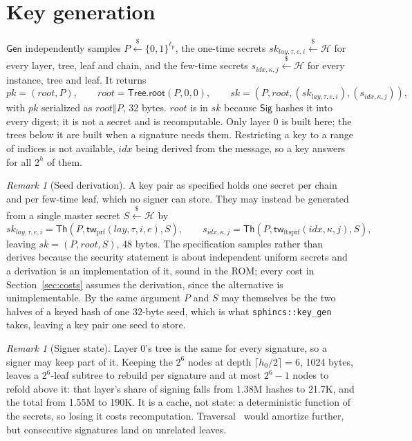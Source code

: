 \documentclass[11pt]{article}
\theoremstyle{definition}
\theoremstyle{plain}
\theoremstyle{remark}
\newtheorem{remark}[definition]{Remark}
\newcommand{\bits}[1]{\{0,1\}^{#1}}
\newcommand{\getsr}{\stackrel{\$}{\gets}}
\newcommand{\Th}{\mathsf{Th}}
\newcommand{\Gen}{\mathsf{Gen}}
\newcommand{\Sig}{\mathsf{Sig}}
\newcommand{\concat}{\mathbin\Vert}
\newcommand{\sk}{\mathit{sk}}
\newcommand{\pk}{\mathit{pk}}
\newcommand{\rootnode}{\mathit{root}}
\newcommand{\lpar}{\ell_{\mathrm{p}}}
\newcommand{\idx}{\mathit{idx}}
\newcommand{\lay}{\mathit{lay}}
\newcommand{\TreeRoot}{\mathsf{Tree.root}}
\begin{document}
\section{Key generation}

$\Gen$ independently samples $P\getsr\bits{\lpar}$, the one-time secrets $\sk_{\lay,\tau,e,i}\getsr\mathcal H$ for every layer, tree, leaf and chain, and the few-time secrets $s_{\idx,\kappa,j}\getsr\mathcal H$ for every instance, tree and leaf. It returns
\[
  \pk=(\rootnode,P),\qquad \rootnode=\TreeRoot(P,0,0),\qquad
  \sk=\left(P,\rootnode,(\sk_{\lay,\tau,e,i}),(s_{\idx,\kappa,j})\right),
\]
with $\pk$ serialized as $\rootnode\concat P$, 32 bytes. $\rootnode$ is in $\sk$ because $\Sig$ hashes it into every digest; it is not a secret and is recomputable. Only layer $0$ is built here; the trees below it are built when a signature needs them. Restricting a key to a range of indices is not available, $\idx$ being derived from the message, so a key answers for all $2^h$ of them.

\begin{remark}[Seed derivation]
\label{rem:seed}
A key pair as specified holds one secret per chain and per few-time leaf, which no signer can store. They may instead be generated from a single master secret $S\getsr\mathcal H$ by
\[
  \sk_{\lay,\tau,e,i}=\Th\!\left(P,\mathsf{tw}_{\mathrm{prf}}(\lay,\tau,i,e),S\right),
  \qquad
  s_{\idx,\kappa,j}=\Th\!\left(P,\mathsf{tw}_{\mathrm{ftsprf}}(\idx,\kappa,j),S\right),
\]
leaving $\sk=(P,\rootnode,S)$, 48 bytes. The specification samples rather than derives because the security statement is about independent uniform secrets and a derivation is an implementation of it, sound in the ROM; every cost in Section~\ref{sec:costs} assumes the derivation, since the alternative is unimplementable. By the same argument $P$ and $S$ may themselves be the two halves of a keyed hash of one $32$-byte seed, which is what \texttt{sphincs::key\_gen} takes, leaving a key pair one seed to store.
\end{remark}

\begin{remark}[Signer state]
\label{rem:cache}
Layer $0$'s tree is the same for every signature, so a signer may keep part of it. Keeping the $2^6$ nodes at depth $\lceil h_0/2\rceil=6$, 1024 bytes, leaves a $2^6$-leaf subtree to rebuild per signature and at most $2^6-1$ nodes to refold above it: that layer's share of signing falls from 1.38M hashes to 21.7K, and the total from 1.55M to 190K. It is a cache, not state: a deterministic function of the secrets, so losing it costs recomputation. Traversal~\cite{BDS08} would amortize further, but consecutive signatures land on unrelated leaves.
\end{remark}
\end{document}
